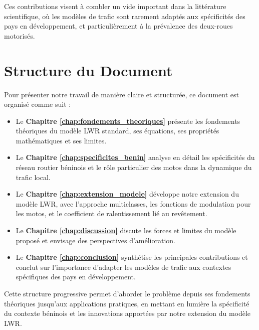 Ces contributions visent à combler un vide important dans la littérature scientifique, où les modèles de trafic sont rarement adaptés aux spécificités des pays en développement, et particulièrement à la prévalence des deux-roues motorisés.

\section{Structure du Document}
\label{sec:structure}

Pour présenter notre travail de manière claire et structurée, ce document est organisé comme suit :

\begin{itemize}
\item Le \textbf{Chapitre \ref{chap:fondements_theoriques}} présente les fondements théoriques du modèle LWR standard, ses équations, ses propriétés mathématiques et ses limites.

\item Le \textbf{Chapitre \ref{chap:specificites_benin}} analyse en détail les spécificités du réseau routier béninois et le rôle particulier des motos dans la dynamique du trafic local.

\item Le \textbf{Chapitre \ref{chap:extension_modele}} développe notre extension du modèle LWR, avec l'approche multiclasses, les fonctions de modulation pour les motos, et le coefficient de ralentissement lié au revêtement.





\item Le \textbf{Chapitre \ref{chap:discussion}} discute les forces et limites du modèle proposé et envisage des perspectives d'amélioration.

\item Le \textbf{Chapitre \ref{chap:conclusion}} synthétise les principales contributions et conclut sur l'importance d'adapter les modèles de trafic aux contextes spécifiques des pays en développement.
\end{itemize}

Cette structure progressive permet d'aborder le problème depuis ses fondements théoriques jusqu'aux applications pratiques, en mettant en lumière la spécificité du contexte béninois et les innovations apportées par notre extension du modèle LWR.
